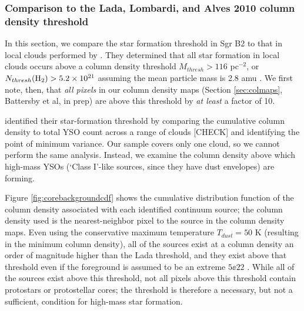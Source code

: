 \documentclass[twocolumn]{aastex61}
\begin{document}




\subsubsection{Comparison to the Lada, Lombardi, and Alves 2010 column density threshold}
\label{sec:ladathreshold}
In this section, we compare the star formation threshold in Sgr B2 to that in
local clouds performed by \citet{Lada2010a}.  They determined that all star
formation in local clouds occurs above a column density threshold $M_{thresh} >
116$ \msun pc$^{-2}$, or $N_{thresh}(\textrm{H}_{2}) > 5.2\times10^{21}$ \persc assuming the
mean particle mass is 2.8 amu \citep{Kauffmann2008a}.  We first note, then,
that \emph{all pixels} in our column density maps (Section \ref{sec:colmaps},
Battersby et al, in prep) are above this threshold by \emph{at least} a factor
of 10.

\citet{Lada2010a} identified their star-formation threshold by comparing the
cumulative column density to total YSO count across a range of clouds [CHECK]
and identifying the point of minimum variance.  Our sample covers only one
cloud, so we cannot perform the same analysis.  Instead, we examine the column
density above which high-mass YSOs (`Class I'-like sources, since they have
dust envelopes) are forming.

Figure \ref{fig:corebackgroundcdf} shows the cumulative distribution function
of the column density associated with each identified continuum source; the
column density used is the nearest-neighbor pixel to the source in the column
density maps.  Even using the conservative maximum temperature $T_{dust}=50$ K
(resulting in the minimum column density), all of the sources exist at a column
density an order of magnitude higher than the Lada threshold, and they exist
above that threshold even if the foreground is assumed to be an extreme
$5\ee{22}$ \persc.  While all of the sources exist above this threshold, not
all pixels above this threshold contain protostars or protostellar cores; the
threshold is therefore a necessary, but not a sufficient, condition for
high-mass star formation.
\end{document}
